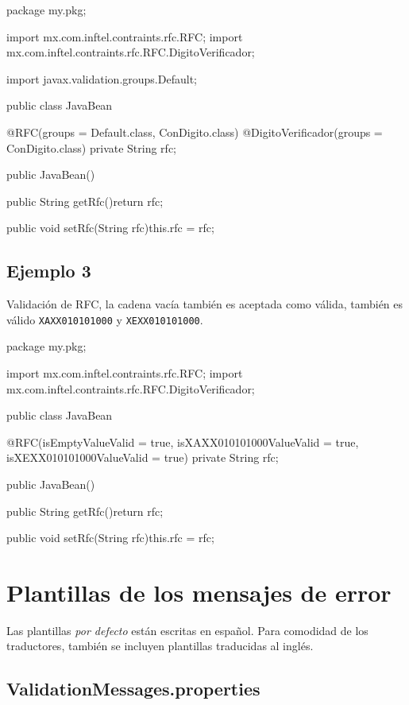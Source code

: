\documentclass[12pt,letterpaper]{article}
\begin{document}
\begin{listing}{1}
package my.pkg;

import mx.com.inftel.contraints.rfc.RFC;
import mx.com.inftel.contraints.rfc.RFC.DigitoVerificador;

import javax.validation.groups.Default;

public class JavaBean{

    @RFC(groups = {Default.class, ConDigito.class})
    @DigitoVerificador(groups = {ConDigito.class})
    private String rfc;

    public JavaBean(){}

    public String getRfc(){return rfc;}

    public void setRfc(String rfc){this.rfc = rfc;}
}
\end{listing}

\subsection{Ejemplo 3}

Validación de RFC, la cadena vacía también es aceptada como válida, también es válido
\texttt{\textquotedbl{}XAXX010101000\textquotedbl} y \texttt{\textquotedbl{}XEXX010101000\textquotedbl}.

\begin{listing}{1}
package my.pkg;

import mx.com.inftel.contraints.rfc.RFC;
import mx.com.inftel.contraints.rfc.RFC.DigitoVerificador;

public class JavaBean{

    @RFC(isEmptyValueValid = true,
         isXAXX010101000ValueValid = true,
         isXEXX010101000ValueValid = true)
    private String rfc;

    public JavaBean(){}

    public String getRfc(){return rfc;}

    public void setRfc(String rfc){this.rfc = rfc;}
}
\end{listing}

\section{Plantillas de los mensajes de error}

Las plantillas \emph{por defecto} están escritas en español. Para comodidad de los traductores,
también se incluyen plantillas traducidas al inglés.

\subsection{ValidationMessages.properties}
\end{document}
